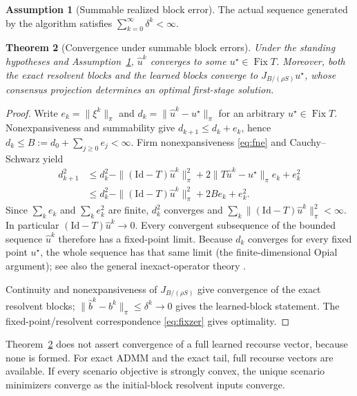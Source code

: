 \documentclass[preprint,12pt,3p]{elsarticle}
\newtheorem{theorem}{Theorem}[section]
\theoremstyle{definition}
\newtheorem{assumption}[theorem]{Assumption}
\begin{document}
\begin{assumption}[Summable realized block error]\label{ass:summable}
The actual sequence generated by the algorithm satisfies $\sum_{k=0}^\infty\delta^k<\infty$.
\end{assumption}

\begin{theorem}[Convergence under summable block errors]\label{thm:summable}
Under the standing hypotheses and Assumption~\ref{ass:summable}, $\widehat u^k$ converges to some $u^\star\in\operatorname{Fix}T$. Moreover, both the exact resolvent blocks and the learned blocks converge to $J_{B/(\rho S)}u^\star$, whose consensus projection determines an optimal first-stage solution.
\end{theorem}
\begin{proof}
Write $e_k=\|\xi^k\|_\pi$ and $d_k=\|\widehat u^k-u^\star\|_\pi$ for an arbitrary $u^\star\in\operatorname{Fix}T$. Nonexpansiveness and summability give $d_{k+1}\leq d_k+e_k$, hence $d_k\leq B:=d_0+\sum_{j\geq0}e_j<\infty$. Firm nonexpansiveness \eqref{eq:fne} and Cauchy--Schwarz yield
\begin{align*}
d_{k+1}^2&\leq d_k^2-\|(\mathrm{Id}-T)\widehat u^k\|_\pi^2+2\|T\widehat u^k-u^\star\|_\pi e_k+e_k^2\\
&\leq d_k^2-\|(\mathrm{Id}-T)\widehat u^k\|_\pi^2+2Be_k+e_k^2.
\end{align*}
Since $\sum_ke_k$ and $\sum_ke_k^2$ are finite, $d_k^2$ converges and $\sum_k\|(\mathrm{Id}-T)\widehat u^k\|_\pi^2<\infty$. In particular $(\mathrm{Id}-T)\widehat u^k\to0$. Every convergent subsequence of the bounded sequence $\widehat u^k$ therefore has a fixed-point limit. Because $d_k$ converges for every fixed point $u^\star$, the whole sequence has that same limit (the finite-dimensional Opial argument); see also the general inexact-operator theory \cite{liang2016convergence}.

Continuity and nonexpansiveness of $J_{B/(\rho S)}$ give convergence of the exact resolvent blocks; $\|\widehat b^k-b^k\|_\pi\leq\delta^k\to0$ gives the learned-block statement. The fixed-point/resolvent correspondence \eqref{eq:fixzer} gives optimality.
\end{proof}
Theorem~\ref{thm:summable} does not assert convergence of a full learned recourse vector, because none is formed. For exact ADMM and the exact tail, full recourse vectors are available. If every scenario objective is strongly convex, the unique scenario minimizers converge as the initial-block resolvent inputs converge.
\end{document}
